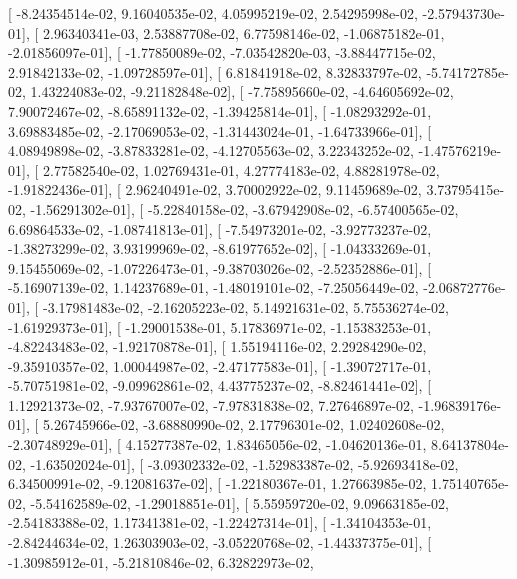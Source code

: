 \documentclass{article}
\begin{document}
       [ -8.24354514e-02,   9.16040535e-02,   4.05995219e-02,
          2.54295998e-02,  -2.57943730e-01],
       [  2.96340341e-03,   2.53887708e-02,   6.77598146e-02,
         -1.06875182e-01,  -2.01856097e-01],
       [ -1.77850089e-02,  -7.03542820e-03,  -3.88447715e-02,
          2.91842133e-02,  -1.09728597e-01],
       [  6.81841918e-02,   8.32833797e-02,  -5.74172785e-02,
          1.43224083e-02,  -9.21182848e-02],
       [ -7.75895660e-02,  -4.64605692e-02,   7.90072467e-02,
         -8.65891132e-02,  -1.39425814e-01],
       [ -1.08293292e-01,   3.69883485e-02,  -2.17069053e-02,
         -1.31443024e-01,  -1.64733966e-01],
       [  4.08949898e-02,  -3.87833281e-02,  -4.12705563e-02,
          3.22343252e-02,  -1.47576219e-01],
       [  2.77582540e-02,   1.02769431e-01,   4.27774183e-02,
          4.88281978e-02,  -1.91822436e-01],
       [  2.96240491e-02,   3.70002922e-02,   9.11459689e-02,
          3.73795415e-02,  -1.56291302e-01],
       [ -5.22840158e-02,  -3.67942908e-02,  -6.57400565e-02,
          6.69864533e-02,  -1.08741813e-01],
       [ -7.54973201e-02,  -3.92773237e-02,  -1.38273299e-02,
          3.93199969e-02,  -8.61977652e-02],
       [ -1.04333269e-01,   9.15455069e-02,  -1.07226473e-01,
         -9.38703026e-02,  -2.52352886e-01],
       [ -5.16907139e-02,   1.14237689e-01,  -1.48019101e-02,
         -7.25056449e-02,  -2.06872776e-01],
       [ -3.17981483e-02,  -2.16205223e-02,   5.14921631e-02,
          5.75536274e-02,  -1.61929373e-01],
       [ -1.29001538e-01,   5.17836971e-02,  -1.15383253e-01,
         -4.82243483e-02,  -1.92170878e-01],
       [  1.55194116e-02,   2.29284290e-02,  -9.35910357e-02,
          1.00044987e-02,  -2.47177583e-01],
       [ -1.39072717e-01,  -5.70751981e-02,  -9.09962861e-02,
          4.43775237e-02,  -8.82461441e-02],
       [  1.12921373e-02,  -7.93767007e-02,  -7.97831838e-02,
          7.27646897e-02,  -1.96839176e-01],
       [  5.26745966e-02,  -3.68880990e-02,   2.17796301e-02,
          1.02402608e-02,  -2.30748929e-01],
       [  4.15277387e-02,   1.83465056e-02,  -1.04620136e-01,
          8.64137804e-02,  -1.63502024e-01],
       [ -3.09302332e-02,  -1.52983387e-02,  -5.92693418e-02,
          6.34500991e-02,  -9.12081637e-02],
       [ -1.22180367e-01,   1.27663985e-02,   1.75140765e-02,
         -5.54162589e-02,  -1.29018851e-01],
       [  5.55959720e-02,   9.09663185e-02,  -2.54183388e-02,
          1.17341381e-02,  -1.22427314e-01],
       [ -1.34104353e-01,  -2.84244634e-02,   1.26303903e-02,
         -3.05220768e-02,  -1.44337375e-01],
       [ -1.30985912e-01,  -5.21810846e-02,   6.32822973e-02,
\end{document}
